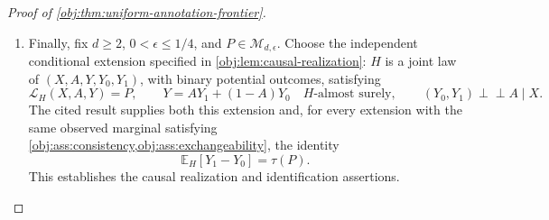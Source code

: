 \documentclass[11pt]{article}
\begin{document}
\begin{proof}[Proof of \cref{obj:thm:uniform-annotation-frontier}]
\begin{enumerate}
\item Finally, fix \(d\ge2\), \(0<\epsilon\le1/4\), and \(P\in\mathcal M_{d,\epsilon}\). Choose the independent conditional extension specified in \cref{obj:lem:causal-realization}: \(H\) is a joint law of \((X,A,Y,Y_0,Y_1)\), with binary potential outcomes, satisfying
\[
\mathcal L_H(X,A,Y)=P,\qquad
Y=AY_1+(1-A)Y_0\quad H\text{-almost surely},
\qquad
(Y_0,Y_1)\perp\!\!\!\perp A\mid X.
\]
The cited result supplies both this extension and, for every extension with the same observed marginal satisfying \cref{obj:ass:consistency,obj:ass:exchangeability}, the identity
\[
\mathbb E_H[Y_1-Y_0]=\tau(P).
\]
This establishes the causal realization and identification assertions.
\end{enumerate}
\end{proof}
\end{document}
